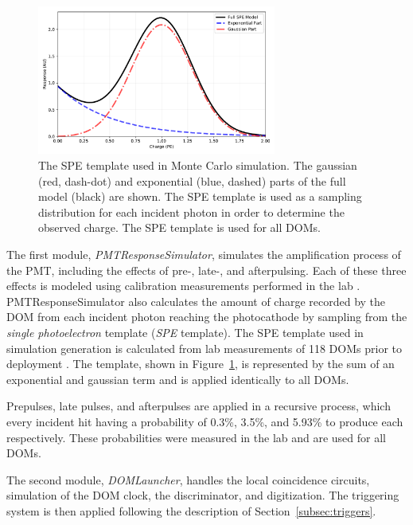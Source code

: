 \begin{figure}
\centering
\includegraphics[width=0.7\textwidth]{ta0003.pdf} 
\caption[The SPE template used in IceCube simulation]{The SPE template used in Monte Carlo simulation. The gaussian (red, dash-dot) and exponential (blue, dashed) parts of the full model (black) are shown. The SPE template is used as a sampling distribution for each incident photon in order to determine the observed charge. The SPE template is used for all DOMs.}
\label{fig:ta0003}
\end{figure}

The first module, \emph{PMTResponseSimulator}, simulates the amplification process of the PMT, including the effects of pre-, late-, and afterpulsing.
Each of these three effects is modeled using calibration measurements performed in the lab \cite{IceCube-PMT}.
PMTResponseSimulator also calculates the amount of charge recorded by the DOM from each incident photon reaching the photocathode by sampling from the \emph{single photoelectron} template (\emph{SPE} template).
The SPE template used in simulation generation is calculated from lab measurements of 118 DOMs prior to deployment \cite{TA0003}.
The template, shown in Figure~\ref{fig:ta0003}, is represented by the sum of an exponential and gaussian term and is applied identically to all DOMs.

Prepulses, late pulses, and afterpulses are applied in a recursive process, which every incident hit having a probability of 0.3\%, 3.5\%, and 5.93\% to produce each respectively.
These probabilities were measured in the lab and are used for all DOMs. 

The second module, \emph{DOMLauncher}, handles the local coincidence circuits, simulation of the DOM clock, the discriminator, and digitization.
The triggering system is then applied following the description of Section~\ref{subsec:triggers}.




